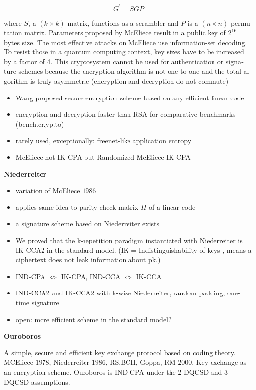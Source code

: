\documentclass[a4paper,11pt,draft]{article}
\begin{document}
\begin{otherlanguage}{english}
\begin{multicols}{2}
$$ G^\prime = SGP $$

where $S$, a $(k \times k)$ matrix, functions as a scrambler and $P$ is a $(n \times n)$ permutation matrix. Parameters proposed by McEliece result in a public key of $2^{16}$ bytes size. The most effective attacks on McEliece use information-set decoding. To resist those in a quantum computing context, key sizes have to be increased by a factor of 4. This cryptosystem cannot be used for authentication or signature schemes because the encryption algorithm is not one-to-one and the total algorithm is truly asymmetric (encryption and decryption do not commute)\\

\begin{itemize} [noitemsep, nolistsep]
\item Wang proposed secure encryption scheme based on any efficient linear code 
\item encryption and decryption faster than RSA for comparative benchmarks (bench.cr.yp.to) 
\item rarely used, exceptionally: freenet-like application entropy 
\item McEliece not IK-CPA but Randomized McEliece IK-CPA 
\end{itemize} 


\textbf{Niederreiter}
\begin{itemize} [noitemsep, nolistsep]
\item variation of McEliece $1986$
\item applies same idea to parity check matrix $H$ of a linear code
\item a signature scheme based on Niederreiter exists
\item We proved	that the k-repetition paradigm instantiated	with Niederreiter is IK-CCA2 in	the	standard model.	(IK = Indistinguishability	of keys , means	a ciphertext does not leak information about pk.)
\item IND-CPA $\nLeftrightarrow$ IK-CPA, IND-CCA $\nLeftrightarrow$ IK-CCA
\item IND-CCA2 and IK-CCA2 with k-wise Niederreiter, random padding, one-time signature
\item open: more efficient scheme in the standard model?
\end{itemize} 

\textbf{Ouroboros}

A simple, secure and efficient key exchange protocol based on coding theory. MCEliece $1978$, Niederreiter $1986$, RS,BCH, Goppa, RM $2000$. Key exchange as an encryption scheme. Ouroboros is IND-CPA under the 2-DQCSD and 3-DQCSD assumptions.


\end{multicols}
\end{otherlanguage}
\end{document}
